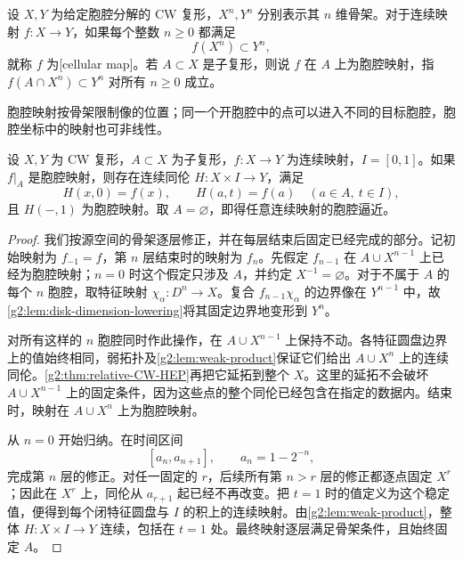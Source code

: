 \begin{definition}\label{g2:def:cellular-map}
	设 \(X,Y\) 为给定胞腔分解的 CW 复形，\(X^n,Y^n\) 分别表示其 \(n\) 维骨架。对于连续映射 \(f:X\to Y\)，如果每个整数 \(n\ge0\) 都满足
	\[
		f(X^n)\subset Y^n,
	\]
	就称 \(f\) 为[cellular map]。若 \(A\subset X\) 是子复形，则说 \(f\) 在 \(A\) 上为胞腔映射，指 \(f(A\cap X^n)\subset Y^n\) 对所有 \(n\ge0\) 成立。
\end{definition}

胞腔映射按骨架限制像的位置；同一个开胞腔中的点可以进入不同的目标胞腔，胞腔坐标中的映射也可非线性。

\begin{theorem}[胞腔逼近]\label{g2:thm:cellular-approximation}
	设 \(X,Y\) 为 CW 复形，\(A\subset X\) 为子复形，\(f:X\to Y\) 为连续映射，\(I=[0,1]\)。如果 \(f|_A\) 是胞腔映射，则存在连续同伦 \(H:X\times I\to Y\)，满足
	\[
		H(x,0)=f(x),\qquad H(a,t)=f(a)
		\quad(a\in A,\ t\in I),
	\]
	且 \(H(-,1)\) 为胞腔映射。取 \(A=\varnothing\)，即得任意连续映射的胞腔逼近。
\end{theorem}
\begin{proof}
	我们按源空间的骨架逐层修正，并在每层结束后固定已经完成的部分。记初始映射为 \(f_{-1}=f\)，第 \(n\) 层结束时的映射为 \(f_n\)。先假定 \(f_{n-1}\) 在 \(A\cup X^{n-1}\) 上已经为胞腔映射；\(n=0\) 时这个假定只涉及 \(A\)，并约定 \(X^{-1}=\varnothing\)。对于不属于 \(A\) 的每个 \(n\) 胞腔，取特征映射 \(\chi_\alpha:D^n\to X\)。复合 \(f_{n-1}\chi_\alpha\) 的边界像在 \(Y^{n-1}\) 中，故\cref{g2:lem:disk-dimension-lowering}将其固定边界地变形到 \(Y^n\)。

	对所有这样的 \(n\) 胞腔同时作此操作，在 \(A\cup X^{n-1}\) 上保持不动。各特征圆盘边界上的值始终相同，弱拓扑及\cref{g2:lem:weak-product}保证它们给出 \(A\cup X^n\) 上的连续同伦。\cref{g2:thm:relative-CW-HEP}再把它延拓到整个 \(X\)。这里的延拓不会破坏 \(A\cup X^{n-1}\) 上的固定条件，因为这些点的整个同伦已经包含在指定的数据内。结束时，映射在 \(A\cup X^n\) 上为胞腔映射。

	从 \(n=0\) 开始归纳。在时间区间
	\[
		[a_n,a_{n+1}],\qquad a_n=1-2^{-n},
	\]
	完成第 \(n\) 层的修正。对任一固定的 \(r\)，后续所有第 \(n>r\) 层的修正都逐点固定 \(X^r\)；因此在 \(X^r\) 上，同伦从 \(a_{r+1}\) 起已经不再改变。把 \(t=1\) 时的值定义为这个稳定值，便得到每个闭特征圆盘与 \(I\) 的积上的连续映射。由\cref{g2:lem:weak-product}，整体 \(H:X\times I\to Y\) 连续，包括在 \(t=1\) 处。最终映射逐层满足骨架条件，且始终固定 \(A\)。
\end{proof}

